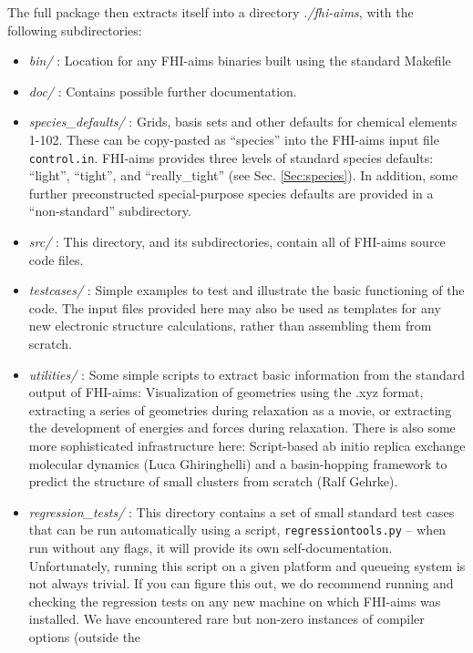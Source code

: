 The full package then extracts itself into a directory \emph{./fhi-aims}, with the
following subdirectories:
\begin{itemize}
  \item \emph{bin/} : Location for any FHI-aims binaries built using the
    standard Makefile
  \item \emph{doc/} : Contains possible further documentation.
  \item \emph{species\_defaults/} : Grids, basis sets and other defaults for
    chemical elements 1-102. These can be copy-pasted as ``species'' into the
    FHI-aims input file \texttt{control.in}. FHI-aims provides three levels of
    standard species defaults: ``light'', ``tight'',
    and ``really\_tight'' (see Sec. \ref{Sec:species}). In addition,
    some further preconstructed special-purpose species defaults are
    provided in a ``non-standard'' subdirectory.
  \item \emph{src/} : This directory, and its subdirectories, contain all of FHI-aims source code files.
  \item \emph{testcases/} : Simple examples to test and illustrate the basic
    functioning of the code. The input files provided here may also be used as
    templates for any new electronic structure calculations, rather than
    assembling them from scratch.
  \item \emph{utilities/} : Some simple scripts to extract basic
    information from the standard output of FHI-aims:
    Visualization of geometries using the .xyz format, extracting a
    series of geometries during relaxation as a movie, or extracting
    the development of energies and forces during relaxation. There is
    also some more sophisticated infrastructure here: Script-based
    ab initio replica exchange molecular dynamics (Luca Ghiringhelli)
    and a basin-hopping framework to predict the structure of small
    clusters from scratch (Ralf Gehrke).
  \item \emph{regression\_tests/} : This directory contains a set of small standard
    test cases that can be run automatically using a script, \texttt{regressiontools.py} --
    when run without any flags, it will provide its own self-documentation.
    Unfortunately, running this script on a given platform and
    queueing system is not always trivial. If you can figure this out, we do recommend running and
    checking the regression tests on any new 
    machine on which FHI-aims was installed. We have encountered 
    rare but non-zero instances of compiler options (outside the

\end{itemize}
